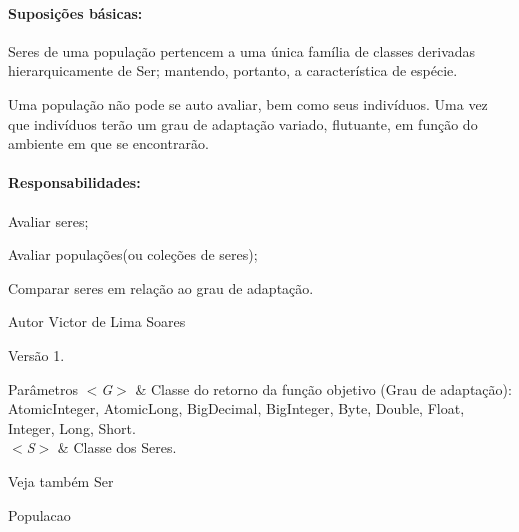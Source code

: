 \paragraph*{Suposições básicas\-:}


\begin{DoxyItemize}
\item Seres de uma população pertencem a uma única família de classes derivadas hierarquicamente de {\ttfamily Ser}; mantendo, portanto, a característica de espécie. 
\item Uma população não pode se auto avaliar, bem como seus indivíduos. Uma vez que indivíduos terão um grau de adaptação variado, flutuante, em função do ambiente em que se encontrarão.  
\end{DoxyItemize}

\paragraph*{Responsabilidades\-:}


\begin{DoxyItemize}
\item Avaliar seres; 
\item Avaliar populações(ou coleções de seres); 
\item Comparar seres em relação ao grau de adaptação. 
\end{DoxyItemize}

\begin{DoxyAuthor}{Autor}
Victor de Lima Soares 
\end{DoxyAuthor}
\begin{DoxyVersion}{Versão}
1.
\end{DoxyVersion}

\begin{DoxyParams}{Parâmetros}
{\em $<$\-G$>$} & Classe do retorno da função objetivo (Grau de adaptação)\-: Atomic\-Integer, Atomic\-Long, Big\-Decimal, Big\-Integer, Byte, Double, Float, Integer, Long, Short. \\
\hline
{\em $<$\-S$>$} & Classe dos Seres.\\
\hline
\end{DoxyParams}
\begin{DoxySeeAlso}{Veja também}
Ser 

Populacao 
\end{DoxySeeAlso}


